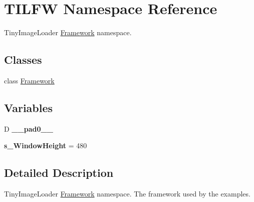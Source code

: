 \hypertarget{namespace_t_i_l_f_w}{
\section{TILFW Namespace Reference}
\label{namespace_t_i_l_f_w}
}


TinyImageLoader \hyperlink{class_t_i_l_f_w_1_1_framework}{Framework} namespace.  


\subsection*{Classes}
\begin{DoxyCompactItemize}
\item 
class \hyperlink{class_t_i_l_f_w_1_1_framework}{Framework}
\end{DoxyCompactItemize}
\subsection*{Variables}
\begin{DoxyCompactItemize}
\item 
\hypertarget{namespace_t_i_l_f_w_a5a6b9c19ed6a42d133f77a0897579243}{
D {\bfseries \_\-\_\-pad0\_\-\_\-}}
\label{namespace_t_i_l_f_w_a5a6b9c19ed6a42d133f77a0897579243}

\item 
\hypertarget{namespace_t_i_l_f_w_a74d9924a1a473f0ff11e69da582501ec}{
{\bfseries s\_\-WindowHeight} = 480}
\label{namespace_t_i_l_f_w_a74d9924a1a473f0ff11e69da582501ec}

\end{DoxyCompactItemize}


\subsection{Detailed Description}
TinyImageLoader \hyperlink{class_t_i_l_f_w_1_1_framework}{Framework} namespace. The framework used by the examples. 